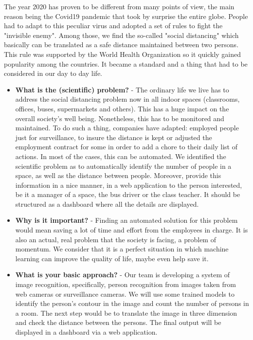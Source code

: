 \documentclass[runningheads,a4paper,11pt]{report}
\begin{document}
The year 2020 has proven to be different from many points of view, the main reason being the Covid19 pandemic that took by surprise the entire globe. People had to adapt to this peculiar virus and adopted a set of rules to fight the "invisible enemy". Among those, we find the so-called "social distancing" which basically can be translated as a safe distance maintained between two persons. This rule was supported by the World Health Organization so it quickly gained popularity among the countries. It became a standard and a thing that had to be considered in our day to day life.
\begin{itemize}
	\item \textbf{What is the (scientific) problem?} - The ordinary life we live has to address the social distancing problem now in all indoor spaces (classrooms, offices, buses, supermarkets and others). This has a huge impact on the overall society's well being. Nonetheless, this has to be monitored and maintained. To do such a thing, companies have adapted: employed people just for surveillance, to insure the distance is kept or adjusted the employment contract for some in order to add a chore to their daily list of actions. In most of the cases, this can be automated. We identified the scientific problem as to automatically identify the number of people in a space, as well as the distance between people. Moreover, provide this information in a nice manner, in a web application to the person interested, be it a manager of a space, the bus driver or the class teacher. It should be structured as a dashboard where all the details are displayed.
	\item \textbf{Why is it important?} - Finding an automated solution for this problem would mean saving a lot of time and effort from the employees in charge. It is also an actual, real problem that the society is facing, a problem of momentum. We consider that it is a perfect situation in which machine learning can improve the quality of life, maybe even help save it. 
	\item \textbf{What is your basic approach?} - Our team is developing a system of image recognition, specifically, person recognition from images taken from web cameras or surveillance cameras. We will use some trained models to identify the person's contour in the image and count the number of persons in a room. The next step would be to translate the image in three dimension and check the distance between the persons. The final output will be displayed in a dashboard via a web application.
\end{itemize}
\end{document}
